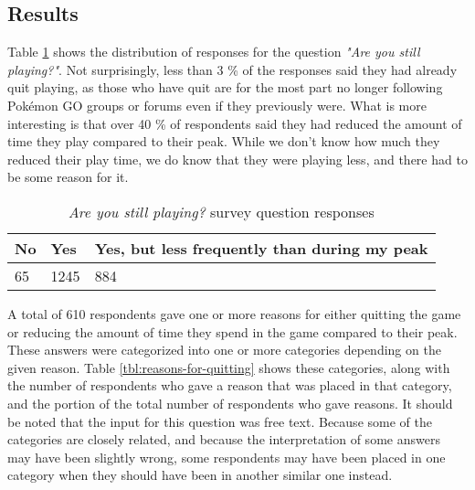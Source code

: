 
\subsection{Results}

Table \ref{tbl:still-playing}  shows the distribution of responses for the question \emph{"Are you still playing?"}. Not surprisingly, less than 3 \% of the responses said they had already quit playing, as those who have quit are for the most part no longer following Pokémon GO groups or forums even if they previously were. What is more interesting is that over 40 \% of respondents said they had reduced the amount of time they play compared to their peak. While we don't know how much they reduced their play time, we do know that they were playing less, and there had to be some reason for it.

\begin{table}[h]
	\centering
	\label{tbl:still-playing}
	\begin{tabular}{|l|l|l|}
		\hline
		\textbf{No} & \textbf{Yes} & \textbf{Yes, but less frequently than during my peak}\\
		\hline\hline
		65 & 1245 & 884\\\hline
	\end{tabular}
	\caption{\emph{Are you still playing?} survey question responses}
\end{table}

A total of 610 respondents gave one or more reasons for either quitting the game or reducing the amount of time they spend in the game compared to their peak. These answers were categorized into one or more categories depending on the given reason. Table \ref{tbl:reasons-for-quitting}  shows these categories, along with the number of respondents who gave a reason that was placed in that category, and the portion of the total number of respondents who gave reasons. It should be noted that the input for this question was free text. Because some of the categories are closely related, and because the interpretation of some answers may have been slightly wrong, some respondents may have been placed in one category when they should have been in another similar one instead.

